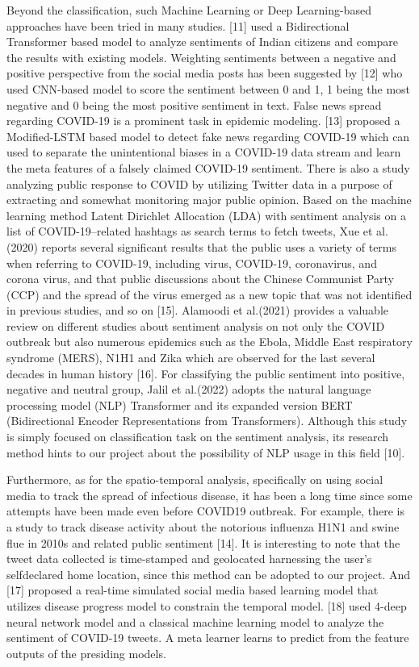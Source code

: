 Beyond the classification, such Machine Learning or Deep Learning-based
approaches have been tried in many studies. [11] used a Bidirectional
Transformer based model to analyze sentiments of Indian citizens and compare
the results with existing models. Weighting sentiments between a negative and
positive perspective from the social media posts has been suggested by
[12] who used CNN-based model to score the sentiment between 0 and 1, 1 being
the most negative and 0 being the most positive sentiment in text. False news
spread regarding COVID-19 is a prominent task in epidemic modeling.
[13] proposed a Modified-LSTM based model to detect fake news regarding
COVID-19 which can used to separate the unintentional biases in a COVID-19
data stream and learn the meta features of a falsely claimed COVID-19
sentiment. There is also a study analyzing public response to COVID by
utilizing Twitter data in a purpose of extracting and somewhat monitoring
major public opinion. Based on the machine learning method Latent Dirichlet
Allocation (LDA) with sentiment analysis on a list of COVID-19–related
hashtags as search terms to fetch tweets, Xue et al.(2020) reports several
significant results that the public uses a variety of terms when referring to
COVID-19, including virus, COVID-19, coronavirus, and corona virus, and that
public discussions about the Chinese Communist Party (CCP) and the spread of
the virus emerged as a new topic that was not identified in previous studies,
and so on [15]. Alamoodi et al.(2021) provides a valuable review on different
studies about sentiment analysis on not only the COVID outbreak but also
numerous epidemics such as the Ebola, Middle East respiratory syndrome
(MERS), N1H1 and Zika which are observed for the last several decades in
human history [16]. For classifying the public sentiment into positive,
negative and neutral group, Jalil et al.(2022) adopts the natural language
processing model (NLP) Transformer and its expanded version BERT
(Bidirectional Encoder Representations from Transformers). Although this
study is simply focused on classification task on the sentiment analysis, its
research method hints to our project about the possibility of NLP usage in
this field [10].

Furthermore, as for the spatio-temporal analysis, specifically on using social
media to track the spread of infectious disease, it has been a long time
since some attempts have been made even before COVID19 outbreak. For example,
there is a study to track disease activity about the notorious influenza H1N1
and swine flue in 2010s and related public sentiment [14]. It is interesting
to note that the tweet data collected is time-stamped and geolocated
harnessing the user’s selfdeclared home location, since this method can be
adopted to our project. And [17] proposed a real-time simulated social media
based learning model that utilizes disease progress model to constrain the
temporal model. [18] used 4-deep neural network model and a classical machine
learning model to analyze the sentiment of COVID-19 tweets. A meta learner
learns to predict from the feature outputs of the presiding models.

